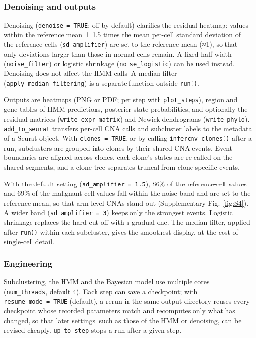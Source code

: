 \subsubsection{Denoising and outputs}

Denoising (\texttt{denoise\ =\ TRUE}; off by default) clarifies the residual heatmap: values within the reference mean ± 1.5 times the mean per-cell standard deviation of the reference cells (\texttt{sd\_amplifier}) are set to the reference mean (≈1), so that only deviations larger than those in normal cells remain. A fixed half-width (\texttt{noise\_filter}) or logistic shrinkage (\texttt{noise\_logistic}) can be used instead. Denoising does not affect the HMM calls. A median filter (\texttt{apply\_median\_filtering}) is a separate function outside \texttt{run()}.

Outputs are heatmaps (PNG or PDF; per step with \texttt{plot\_steps}), region and gene tables of HMM predictions, posterior state probabilities, and optionally the residual matrices (\texttt{write\_expr\_matrix}) and Newick dendrograms (\texttt{write\_phylo}). \texttt{add\_to\_seurat} transfers per-cell CNA calls and subcluster labels to the metadata of a Seurat object. With \texttt{clones\ =\ TRUE}, or by calling \texttt{infercnv\_clones()} after a run, subclusters are grouped into clones by their shared CNA events. Event boundaries are aligned across clones, each clone's states are re-called on the shared segments, and a clone tree separates truncal from clone-specific events.

With the default setting (\texttt{sd\_amplifier = 1.5}), 86\% of the reference-cell values and 69\% of the malignant-cell values fall within the noise band and are set to the reference mean, so that arm-level CNAs stand out (Supplementary Fig.~\ref{fig:S4}). A wider band (\texttt{sd\_amplifier = 3}) keeps only the strongest events. Logistic shrinkage replaces the hard cut-off with a gradual one. The median filter, applied after \texttt{run()} within each subcluster, gives the smoothest display, at the cost of single-cell detail.

\subsubsection{Engineering}

Subclustering, the HMM and the Bayesian model use multiple cores (\texttt{num\_threads}, default 4). Each step can save a checkpoint; with \texttt{resume\_mode\ =\ TRUE} (default), a rerun in the same output directory reuses every checkpoint whose recorded parameters match and recomputes only what has changed, so that later settings, such as those of the HMM or denoising, can be revised cheaply. \texttt{up\_to\_step} stops a run after a given step.

